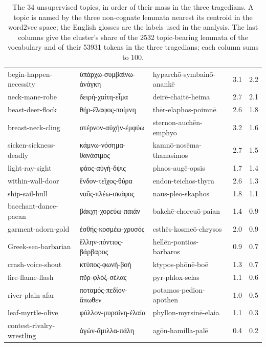 \begin{table}[htbp]
\begin{tabularx}{\textwidth}{XXXrr}
begin-happen-necessity & ὑπάρχω-συμβαίνω-ἀνάγκη & hyparchō-symbainō-anankē & 3.1 & 2.2 \\
neck-mane-robe & δειρή-χαίτη-εἷμα & deirē-chaitē-heima & 2.7 & 2.1 \\
beast-deer-flock & θήρ-ἔλαφος-ποίμνη & thēr-elaphos-poimnē & 2.6 & 1.8 \\
breast-neck-cling & στέρνον-αὐχήν-ἐμφύω & sternon-auchēn-emphyō & 3.2 & 1.6 \\
sicken-sickness-deadly & κάμνω-νόσημα-θανάσιμος & kamnō-nosēma-thanasimos & 2.7 & 1.5 \\
light-ray-sight & φάος-αὐγή-ὄψις & phaos-augē-opsis & 1.7 & 1.4 \\
within-wall-door & ἔνδον-τεῖχος-θύρα & endon-teichos-thyra & 2.6 & 1.3 \\
ship-sail-hull & ναῦς-πλέω-σκάφος & naus-pleō-skaphos & 1.8 & 1.1 \\
bacchant-dance-paean & βάκχη-χορεύω-παιάν & bakchē-choreuō-paian & 1.4 & 0.9 \\
garment-adorn-gold & ἐσθής-κοσμέω-χρυσός & esthēs-kosmeō-chrysos & 2.0 & 0.9 \\
Greek-sea-barbarian & ἕλλην-πόντιος-βάρβαρος & hellēn-pontios-barbaros & 0.9 & 0.7 \\
crash-voice-shout & κτύπος-φωνή-βοή & ktypos-phōnē-boē & 1.3 & 0.7 \\
fire-flame-flash & πῦρ-φλόξ-σέλας & pyr-phlox-selas & 1.1 & 0.6 \\
river-plain-afar & ποταμός-πεδίον-ἄπωθεν & potamos-pedion-apōthen & 1.0 & 0.5 \\
leaf-myrtle-olive & φύλλον-μυρσίνη-ἐλαία & phyllon-myrsinē-elaia & 1.1 & 0.3 \\
contest-rivalry-wrestling & ἀγών-ἅμιλλα-πάλη & agōn-hamilla-palē & 0.4 & 0.2 \\
\bottomrule
\end{tabularx}
\caption{The 34 unsupervised topics, in order of their mass in the three tragedians. A topic is named by the three
non-cognate lemmata nearest its centroid in the word2vec space; the English glosses are the labels used in the
analysis. The last columns give the cluster's share of the 2532 topic-bearing lemmata of the vocabulary and of their 53931
tokens in the three tragedians; each column sums to 100.}
\label{tab:topics}
\end{table}
